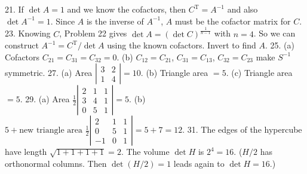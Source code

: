 21. If \(\det A=1\) and we know the cofactors, then \(C^{\mathrm{T}}=A^{-1}\) and also \(\det A^{-1}=1\). Since \(A\) is the inverse of \(A^{-1}\), \(A\) must be the cofactor matrix for \(C\).
23. Knowing \(C\), Problem 22 gives \(\det A=(\det C)^{\frac{1}{n-1}}\) with \(n=4\). So we can construct \(A^{-1}=C^{\mathrm{T}}/\det A\) using the known cofactors. Invert to find \(A\).
25. (a) Cofactors \(C_{21}=C_{31}=C_{32}=0\). (b) \(C_{12}=C_{21}\), \(C_{31}=C_{13}\), \(C_{32}=C_{23}\) make \(S^{-1}\) symmetric.
27. (a) Area \(\left|\begin{smallmatrix}3&2\\ 1&4\end{smallmatrix}\right|=10\). (b) Triangle area \(=5\). (c) Triangle area \(=5\).
29. (a) Area \(\frac{1}{2}\left|\begin{smallmatrix}2&1&1\\ 3&4&1\\ 0&5&1\end{smallmatrix}\right|=5\). (b) \(5+\text{new triangle area }\frac{1}{2}\left|\begin{smallmatrix}2&1&1\\ 0&5&1\\ -1&0&1\end{smallmatrix}\right|=5+7=12\).
31. The edges of the hypercube have length \(\sqrt{1+1+1+1}=2\). The volume \(\det H\) is \(2^{4}=16\). (\(H/2\) has orthonormal columns. Then \(\det(H/2)=1\) leads again to \(\det H=16\).) 